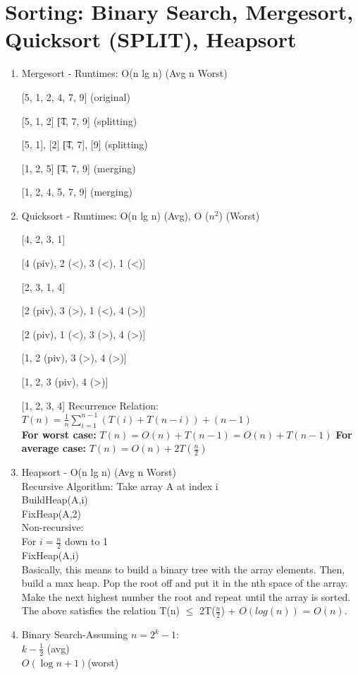 \documentclass{article}
\begin{document}
\section*{Sorting: Binary Search, Mergesort, Quicksort (SPLIT), Heapsort}
	\begin{enumerate}
		\item Mergesort - Runtimes: O(n lg n) (Avg n Worst)
        
        	[5, 1, 2, 4, 7, 9] (original)
            
           	[5, 1, 2] \t [4, 7, 9] (splitting)
            
            [5, 1], [2] \t [4, 7], [9] (splitting)
            
            [1, 2, 5] \t [4, 7, 9] (merging)
            
            [1, 2, 4, 5, 7, 9] (merging)
            
        \item Quicksort - Runtimes: O(n lg n) (Avg), O ($n^2$) (Worst)
        
        	[4, 2, 3, 1]
            
            [4 (piv), 2 (<), 3 (<), 1 (<)]
            
            [2, 3, 1, 4]
            
            [2 (piv), 3 (>), 1 (<), 4 (>)]
            
            [2 (piv), 1 (<), 3 (>), 4 (>)]
            
            [1, 2 (piv), 3 (>), 4 (>)]
            
            [1, 2, 3 (piv), 4 (>)]
            
            [1, 2, 3, 4]
            Recurrence Relation:\\
            $T(n)=\frac{1}{n}\sum_{i=1}^{n-1}(T(i)+T(n-i))+(n-1)$\\
            \textbf{For worst case: }$T(n)=O(n)+T(n-1)=O(n)+T(n-1)$
            \textbf{For average case: }$T(n)=O(n)+2T(\frac{n}{2})$\\
        \item Heapsort - O(n lg n) (Avg n Worst)\\
        	Recursive Algorithm: Take array A at index i\\
            BuildHeap(A,i)\\
             FixHeap(A,2)\\
            Non-recursive:\\
            For $i=\frac{n}{2}$ down to 1\\
            FixHeap(A,i)\\
            Basically, this means to build a binary tree with the array elements. Then, build a max heap. Pop the root off and put it in the nth space of the array. Make the next highest number the root and repeat until the array is sorted.\\
          The above satisfies the relation T(n) $\leq$ 2T($\frac{n}{2}$) + $O(log(n))$ = $O(n)$.   
        \item Binary Search-Assuming $n=2^k-1$:\\
        $k-\frac{1}{2}$ (avg)\\
        $O(\log{n}+1)$(worst)\\
	\end{enumerate}
\end{document}
